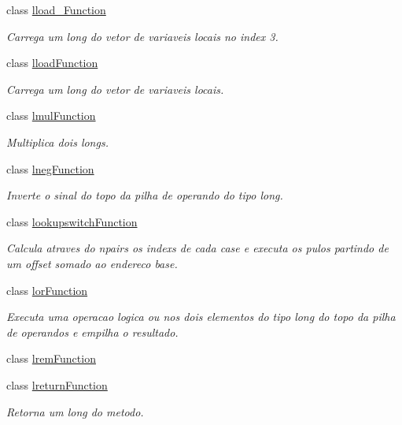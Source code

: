 \begin{DoxyCompactItemize}
class \hyperlink{classInstruction_1_1lload__3Function}{lload\+\_\+Function}
\begin{DoxyCompactList}\small\item\em Carrega um long do vetor de variaveis locais no index 3. \end{DoxyCompactList}\item 
class \hyperlink{classInstruction_1_1lloadFunction}{lload\+Function}
\begin{DoxyCompactList}\small\item\em Carrega um long do vetor de variaveis locais. \end{DoxyCompactList}\item 
class \hyperlink{classInstruction_1_1lmulFunction}{lmul\+Function}
\begin{DoxyCompactList}\small\item\em Multiplica dois longs. \end{DoxyCompactList}\item 
class \hyperlink{classInstruction_1_1lnegFunction}{lneg\+Function}
\begin{DoxyCompactList}\small\item\em Inverte o sinal do topo da pilha de operando do tipo long. \end{DoxyCompactList}\item 
class \hyperlink{classInstruction_1_1lookupswitchFunction}{lookupswitch\+Function}
\begin{DoxyCompactList}\small\item\em Calcula atraves do npairs os indexs de cada case e executa os pulos partindo de um offset somado ao endereco base. \end{DoxyCompactList}\item 
class \hyperlink{classInstruction_1_1lorFunction}{lor\+Function}
\begin{DoxyCompactList}\small\item\em Executa uma operacao logica \textquotesingle{}ou\textquotesingle{} nos dois elementos do tipo long do topo da pilha de operandos e empilha o resultado. \end{DoxyCompactList}\item 
class \hyperlink{classInstruction_1_1lremFunction}{lrem\+Function}
\item 
class \hyperlink{classInstruction_1_1lreturnFunction}{lreturn\+Function}
\begin{DoxyCompactList}\small\item\em Retorna um long do metodo. \end{DoxyCompactList}\item 

\end{DoxyCompactItemize}
